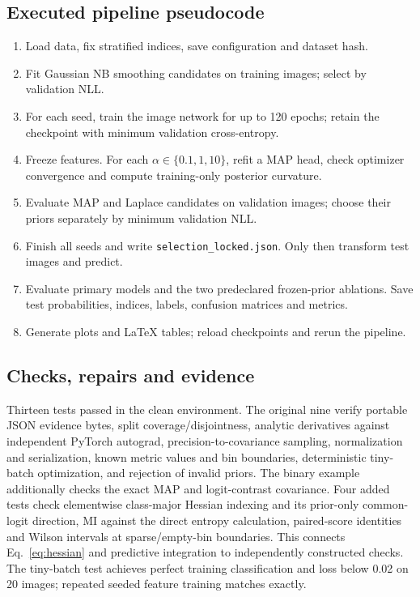 \documentclass[10pt,a4paper]{article}
\begin{document}
\subsection{Executed pipeline pseudocode}
\begin{enumerate}[leftmargin=*,label=\arabic*.]
\item Load data, fix stratified indices, save configuration and dataset hash.
\item Fit Gaussian NB smoothing candidates on training images; select by validation NLL.
\item For each seed, train the image network for up to 120 epochs; retain the
checkpoint with minimum validation cross-entropy.
\item Freeze features. For each $\alpha\in\{0.1,1,10\}$, refit a MAP head,
check optimizer convergence and compute training-only posterior curvature.
\item Evaluate MAP and Laplace candidates on validation images; choose their
priors separately by minimum validation NLL.
\item Finish all seeds and write \texttt{selection\_locked.json}. Only then
transform test images and predict.
\item Evaluate primary models and the two predeclared frozen-prior ablations.
Save test probabilities, indices, labels, confusion matrices and metrics.
\item Generate plots and LaTeX tables; reload checkpoints and rerun the pipeline.
\end{enumerate}

\subsection{Checks, repairs and evidence}
Thirteen tests passed in the clean environment. The original nine verify portable JSON evidence bytes, split coverage/disjointness, analytic derivatives
against independent PyTorch autograd, precision-to-covariance sampling,
normalization and serialization, known metric values and bin boundaries,
deterministic tiny-batch optimization, and rejection of invalid priors.
The binary example additionally checks the exact MAP and logit-contrast covariance.
Four added tests check elementwise class-major Hessian indexing and its prior-only
common-logit direction, MI against the direct entropy calculation, paired-score
identities and Wilson intervals at sparse/empty-bin boundaries. This connects
Eq.~\ref{eq:hessian} and predictive integration to independently constructed checks.
The tiny-batch test achieves perfect training classification and loss below 0.02
on 20 images; repeated seeded feature training matches exactly.
\end{document}
